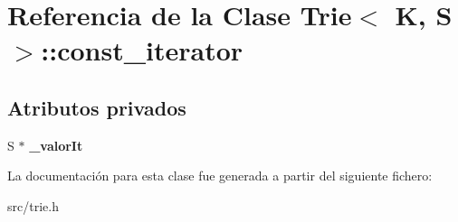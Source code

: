 \hypertarget{classTrie_1_1const__iterator}{\section{Referencia de la Clase Trie$<$ K, S $>$\-:\-:const\-\_\-iterator}
\label{classTrie_1_1const__iterator}
}
\subsection*{Atributos privados}
\begin{DoxyCompactItemize}
\item 
\hypertarget{classTrie_1_1const__iterator_ac1341848a567faf738f15c88939902c7}{S $\ast$ {\bfseries \-\_\-valor\-It}}\label{classTrie_1_1const__iterator_ac1341848a567faf738f15c88939902c7}

\end{DoxyCompactItemize}


La documentación para esta clase fue generada a partir del siguiente fichero\-:\begin{DoxyCompactItemize}
\item 
src/trie.\-h\end{DoxyCompactItemize}
